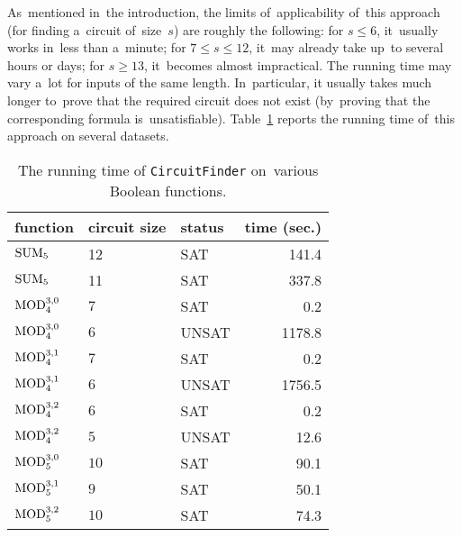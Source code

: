 As~mentioned in~the introduction, the limits
of~applicability of~this approach (for finding a~circuit
of~size~$s$) are roughly the following:
for $s \le 6$, it~usually works in~less than a~minute;
for $7 \le s \le 12$, it~may already take up~to
several hours or days; for $s \ge 13$, it~becomes almost impractical. The running time may vary a~lot
for inputs of the same length. In~particular,
it usually takes much longer to~prove that
the required circuit does not exist (by~proving that the corresponding formula is~unsatisfiable). Table~\ref{table:runningtimes} reports the running time
of~this approach on several datasets.

\begin{table}[!ht]
\begin{center}
\begin{tabular}{lllr}
\toprule
function & circuit size & status & time (sec.)\\
\midrule
$\operatorname{SUM}_5$ & 12 & SAT & 141.4\\
$\operatorname{SUM}_5$ & 11 & SAT & 337.8\\
$\operatorname{MOD}_4^{3,0}$ & $7$ & SAT & 0.2\\
$\operatorname{MOD}_4^{3,0}$ & $6$ & UNSAT & 1178.8\\
$\operatorname{MOD}_4^{3,1}$ & $7$ & SAT & 0.2\\
$\operatorname{MOD}_4^{3,1}$ & $6$ & UNSAT & 1756.5\\
$\operatorname{MOD}_4^{3,2}$ & $6$ & SAT & 0.2\\
$\operatorname{MOD}_4^{3,2}$ & $5$ & UNSAT & 12.6\\
$\operatorname{MOD}_5^{3,0}$ & $10$ & SAT & 90.1\\
$\operatorname{MOD}_5^{3,1}$ & $9$ & SAT & 50.1\\
$\operatorname{MOD}_5^{3,2}$ & $10$ & SAT & 74.3\\
\bottomrule
\end{tabular}
\end{center}
\caption{The running time of \texttt{CircuitFinder} on~various Boolean functions.} \label{table:runningtimes}
\end{table}


